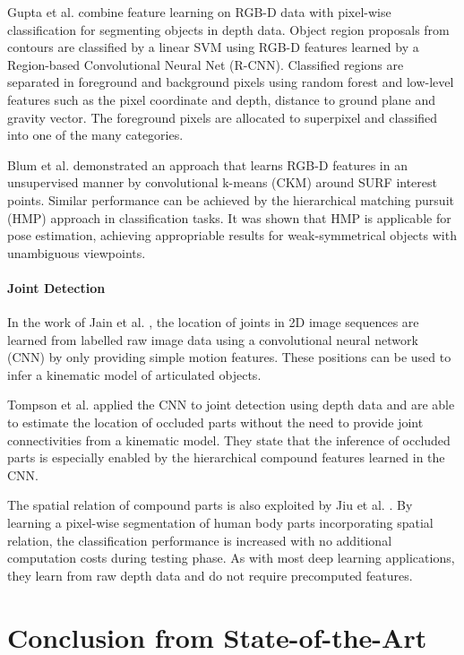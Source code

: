 Gupta et al. \cite{Gupta2014} combine feature learning on RGB-D data with pixel-wise classification for segmenting objects in depth data. Object region proposals from contours are classified by a linear SVM using RGB-D features learned by a Region-based Convolutional Neural Net (R-CNN). Classified regions are separated in foreground and background pixels using random forest and low-level features such as the pixel coordinate and depth, distance to ground plane and gravity vector. The foreground pixels are allocated to superpixel and classified into one of the many categories.

Blum et al. \cite{Blum2012} demonstrated an approach that learns RGB-D features in an unsupervised manner by convolutional k-means (CKM) around SURF interest points. Similar performance can be achieved by the hierarchical matching pursuit (HMP) approach \cite{Bo2013} in classification tasks. It was shown that HMP is applicable for pose estimation, achieving appropriable results for weak-symmetrical objects with unambiguous viewpoints.

\paragraph{Joint Detection}
In the work of Jain et al. \cite{Jain2015}, the location of joints in 2D image sequences are learned from labelled raw image data using a convolutional neural network (CNN) by only providing simple motion features. These positions can be used to infer a kinematic model of articulated objects.

Tompson et al. \cite{Tompson2014} applied the CNN to joint detection using depth data and are able to estimate the location of occluded parts without the need to provide joint connectivities from a kinematic model. They state that the inference of occluded parts is especially enabled by the hierarchical compound features learned in the CNN.

The spatial relation of compound parts is also exploited by Jiu et al. \cite{Jiu2014}. By learning a pixel-wise segmentation of human body parts incorporating spatial relation, the classification performance is increased with no additional computation costs during testing phase. As with most deep learning applications, they learn from raw depth data and do not require precomputed features.



\section{Conclusion from State-of-the-Art}
\label{sec:discussion}

